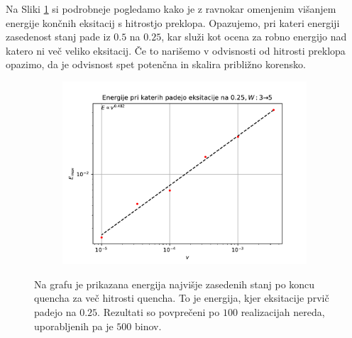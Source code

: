 Na Sliki \ref{fig:Emax} si podrobneje pogledamo kako je z ravnokar omenjenim višanjem energije končnih eksitacij s hitrostjo preklopa. Opazujemo, pri kateri energiji zasedenost stanj pade iz $0.5$ na $0.25$, kar služi kot ocena za robno energijo nad katero ni več veliko eksitacij. Če to narišemo v odvisnosti od hitrosti preklopa opazimo, da je odvisnost spet potenčna in skalira približno korensko.
\begin{figure}[H]
\centering
\begin{subfigure}{.6\textwidth}
\includegraphics[width=\linewidth]{Figures/EmaxP200.pdf}
\end{subfigure}
\caption{Na grafu je prikazana energija najvišje zasedenih stanj po koncu quencha za več hitrosti quencha. To je energija, kjer eksitacije prvič padejo na $0.25$. Rezultati so povprečeni po $100$ realizacijah nereda, uporabljenih pa je $500$ binov.}
\label{fig:Emax}
\end{figure}

